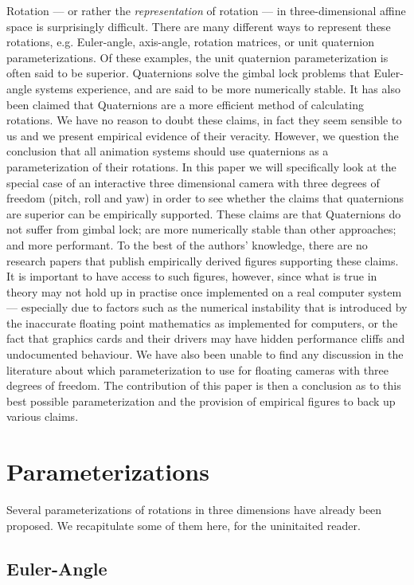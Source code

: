 \documentclass{acm_proc_article-sp}
\begin{document}
Rotation --- or rather the \emph{representation} of rotation --- in three-dimensional affine space is surprisingly difficult.
There are many different ways to represent these rotations, e.g. Euler-angle, axis-angle, rotation matrices, or unit quaternion parameterizations.
Of these examples, the unit quaternion parameterization is often said to be superior.
Quaternions solve the gimbal lock problems that Euler-angle systems experience, and are said to be more numerically stable.
It has also been claimed that Quaternions are a more efficient method of calculating rotations.
We have no reason to doubt these claims, in fact they seem sensible to us and we present empirical evidence of their veracity.
However, we question the conclusion that all animation systems should use quaternions as a parameterization of their rotations.
In this paper we will specifically look at the special case of an interactive three dimensional camera with three degrees of freedom (pitch, roll and yaw) in order to see whether the claims that quaternions are superior can be empirically supported.
These claims are that Quaternions do not suffer from gimbal lock; are more numerically stable than other approaches; and more performant.
To the best of the authors' knowledge, there are no research papers that publish empirically derived figures supporting these claims.
It is important to have access to such figures, however, since what is true in theory may not hold up in practise once implemented on a real computer system ---
especially due to factors such as the numerical instability that is introduced by the inaccurate floating point mathematics as implemented for computers, or the fact that graphics cards and their drivers may have hidden performance cliffs and undocumented behaviour.
We have also been unable to find any discussion in the literature about which parameterization to use for floating cameras with three degrees of freedom.
The contribution of this paper is then a conclusion as to this best possible parameterization and the provision of empirical figures to back up various claims.

\section{Parameterizations}

Several parameterizations of rotations in three dimensions have already been proposed.
We recapitulate some of them here, for the uninitaited reader.

\subsection{Euler-Angle}
\end{document}
